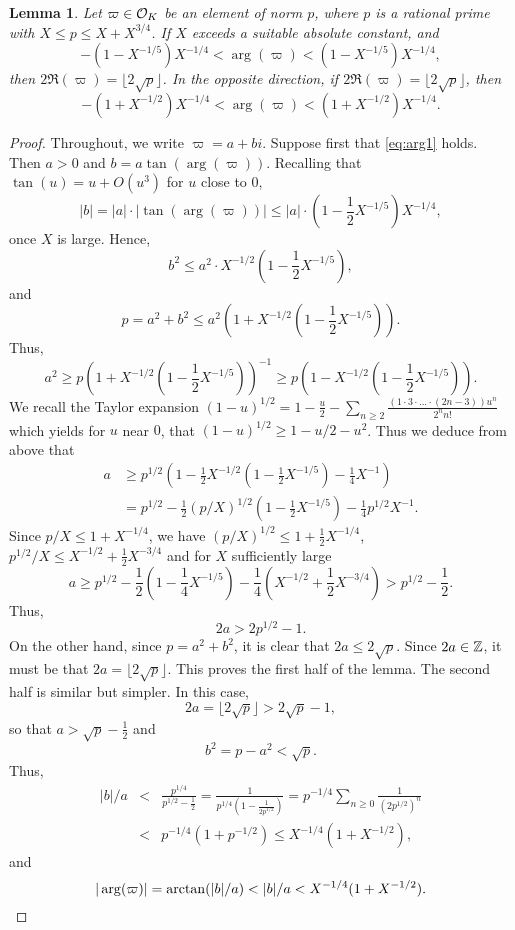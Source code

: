 \documentclass[12pt]{amsart}
\newtheorem{lem}[thm]{Lemma}
\theoremstyle{remark}
\begin{document}
\begin{lem}\label{lem:detect} Let $\varpi \in \mathcal{O}_K$ be an element of norm $p$, where $p$ is a rational prime with $X \le p \le X+X^{3/4}$. If $X$ exceeds a suitable absolute constant, and
\begin{equation}\label{eq:arg1} -(1-X^{-1/5}) X^{-1/4} < \arg(\varpi) < (1-X^{-1/5}) X^{-1/4}, \end{equation}
then $2\Re(\varpi) = \lfloor 2\sqrt{p}\rfloor$. In the opposite direction, if $2\Re(\varpi) = \lfloor 2\sqrt{p}\rfloor$, then
\begin{equation}\label{eq:arg2} -(1+X^{-1/2}) X^{-1/4} < \arg(\varpi) < (1+X^{-1/2}) X^{-1/4}. \end{equation}
\end{lem}
\begin{proof} Throughout, we write $\varpi = a+bi$. Suppose first that \eqref{eq:arg1} holds. Then $a > 0$ and $b= a \tan(\arg(\varpi))$. Recalling that $\tan(u)=u + O(u^3)$ for $u$ close to $0$, 
\[ |b| = |a| \cdot |\tan(\arg(\varpi))| \le |a| \cdot \left(1-\frac{1}{2}X^{-1/5}\right) X^{-1/4}, \]
once $X$ is large. Hence,
\[ b^2 \le a^2 \cdot X^{-1/2} \left(1-\frac{1}{2}X^{-1/5}\right), \]
and 
\[ p = a^2 + b^2 \le a^2\left(1 + X^{-1/2} \left(1-\frac{1}{2}X^{-1/5}\right)\right).\]
Thus,
\[ a^2 \ge p \left(1 + X^{-1/2} \left(1-\frac{1}{2}X^{-1/5}\right)\right)^{-1} \ge  p \left(1 - X^{-1/2} \left(1-\frac{1}{2}X^{-1/5}\right)\right). \]
We recall the Taylor expansion $(1-u)^{1/2}=1-\frac{u}{2}-\sum_{n\ge 2}\frac{(1\cdot3\cdot...\cdot(2n-3))u^n}{2^nn!}$ which yields for
$u$ near $0$, that $(1-u)^{1/2} \ge 1-u/2 -u^2$.
Thus we deduce from above that
\begin{align*} a &\ge p^{1/2} \left(1-\frac{1}{2}X^{-1/2} \left(1-\frac{1}{2}X^{-1/5}\right) - \frac{1}{4}X^{-1}\right) \\
&= p^{1/2} - \frac{1}{2}(p/X)^{1/2} \left(1-\frac{1}{2}X^{-1/5}\right) -\frac{1}{4}p^{1/2}X^{-1}.
  \end{align*}
Since $p/X \le 1 + X^{-1/4}$, we have $(p/X)^{1/2} \le 1+\frac{1}{2}X^{-1/4}$, $p^{1/2}/X\le X^{-1/2}+\frac{1}{2}X^{-3/4}$ and
for $X$ sufficiently large
\[ a \ge p^{1/2} - \frac{1}{2} \left(1-\frac{1}{4}X^{-1/5}\right) -\frac{1}{4}\left(X^{-1/2} + \frac{1}{2}X^{-3/4}\right)> p^{1/2} -\frac{1}{2}.\]
Thus, 
\[ 2a > 2p^{1/2} - 1. \]
On the other hand, since $p=a^2+b^2$, it is clear that $2a \le 2\sqrt{p}$. Since $2a \in \mathbb{Z}$, it must be that $2a=\lfloor 2\sqrt{p}\rfloor$. This proves the first half of the lemma. The second half is similar but simpler. In this case, 
\[ 2a = \lfloor 2\sqrt{p}\rfloor > 2\sqrt{p}-1, \]
so that $a > \sqrt{p}-\frac{1}{2}$ and
\[ b^2 = p-a^2 < \sqrt{p}. \]
Thus,
\begin{eqnarray*}
|b|/a &<& \frac{p^{1/4}}{p^{1/2}-\frac{1}{2}} =\frac{1}{p^{1/4}(1-\frac{1}{2p^{1/2}})}
                                    =p^{-1/4}\sum_{n\ge 0} \frac{1}{(2p^{1/2})^n}\\
&<& p^{-1/4} (1+p^{-1/2})  
 \le X^{-1/4} (1+X^{-1/2}), 
\end{eqnarray*}
and
\[ |\arg(\varpi)| = \arctan(|b|/a) < |b|/a < X^{-1/4} (1+X^{-1/2}). \qedhere\]
\end{proof}
\end{document}
